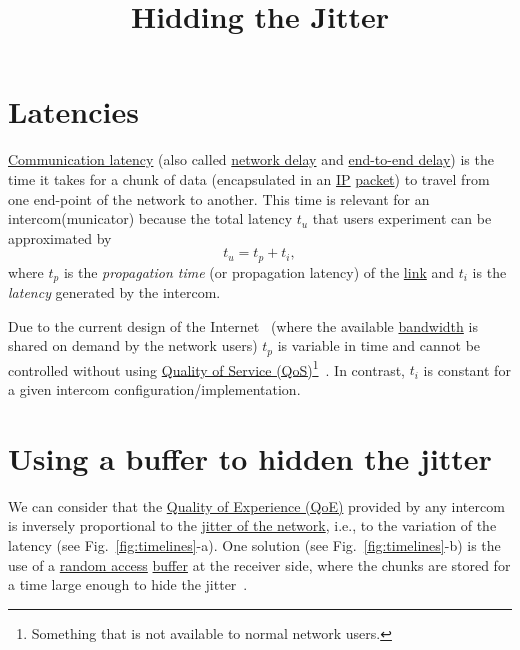 
\title{Hidding the Jitter}

\maketitle
\tableofcontents

\section{Latencies}
\href{https://en.wikipedia.org/wiki/Latency_(engineering)#Communication_latency}{Communication
  latency} (also called
\href{https://en.wikipedia.org/wiki/Network_delay}{network delay} and
\href{https://en.wikipedia.org/wiki/End-to-end_delay}{end-to-end
  delay}) is the time it takes for a chunk of data (encapsulated
in an \href{https://en.wikipedia.org/wiki/Internet_Protocol}{IP}
\href{https://en.wikipedia.org/wiki/Network_packet}{packet}) to travel
from one end-point of the network to another. This time is relevant
for an intercom(municator) because the total latency $t_u$ that users
experiment can be approximated by
\begin{equation}
  t_u = t_p + t_i,
  \label{eq:user_latency}
\end{equation}
where $t_p$ is the \emph{propagation time} (or propagation latency) of
the \href{https://en.wikipedia.org/wiki/Telecommunications_link}{link}
and $t_i$ is the \emph{latency} generated by the intercom.

Due to the current design of the Internet~\cite{Tanenbaum,Stallings}
(where the available
\href{https://en.wikipedia.org/wiki/Bandwidth_(computing)}{bandwidth}
is shared on demand by the network users) $t_p$ is variable in time
and cannot be controlled without using
\href{https://en.wikipedia.org/wiki/Quality_of_service}{Quality of
  Service (QoS)}\footnote{Something that is not available to normal
network users.}~\cite{dordal2020intro}. In contrast, $t_i$ is constant
for a given intercom configuration/implementation.

\section{Using a buffer to hidden the jitter}

We can consider that the
\href{https://en.wikipedia.org/wiki/Quality_of_experience}{Quality of
  Experience (QoE)} provided by any intercom is inversely proportional
to the
\href{https://en.wikipedia.org/wiki/Packet_delay_variation}{jitter of
  the network}, i.e., to the variation of the latency (see
Fig.~\ref{fig:timelines}-a). One solution (see
Fig.~\ref{fig:timelines}-b) is the use of a
\href{https://en.wikipedia.org/wiki/Random_access}{random access}
\href{https://en.wikipedia.org/wiki/Data_buffer}{buffer} at the
receiver side, where the chunks are stored for a time large enough to
hide the jitter~\cite{Kurose-Ross}.

